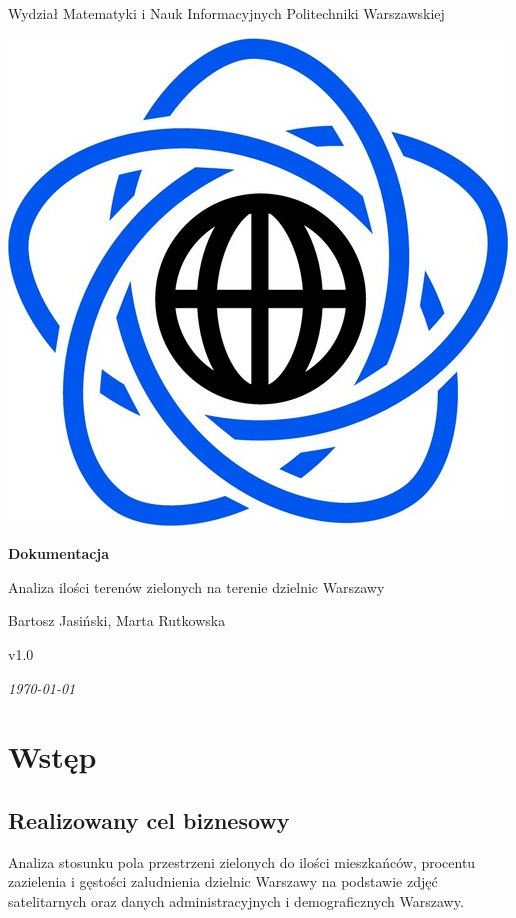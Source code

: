 \documentclass[11pt]{article}
\begin{document}
	
\begin{titlepage}				
\centering

{\Large{Wydział Matematyki i Nauk Informacyjnych Politechniki Warszawskiej}}

\vspace{1cm}		
{\includegraphics[scale=0.25]{logo}}
\vspace{3cm}

\Huge\textbf{Dokumentacja} 
\bigbreak

{\Huge Analiza ilości terenów zielonych na terenie dzielnic Warszawy}
\vspace{1cm}

{\Large Bartosz Jasiński, Marta Rutkowska}
\vspace{1cm}

\Large{v1.0}
\vspace{1cm}

{\itshape {\Large \today}}

\vfill		

\end{titlepage}


\tableofcontents


\newpage

	\section{Wstęp}
	\subsection{Realizowany cel biznesowy}
		Analiza stosunku pola przestrzeni zielonych do ilości mieszkańców, procentu zazielenia i gęstości zaludnienia dzielnic Warszawy na podstawie zdjęć satelitarnych oraz danych administracyjnych i demograficznych Warszawy.
		
\end{document}
